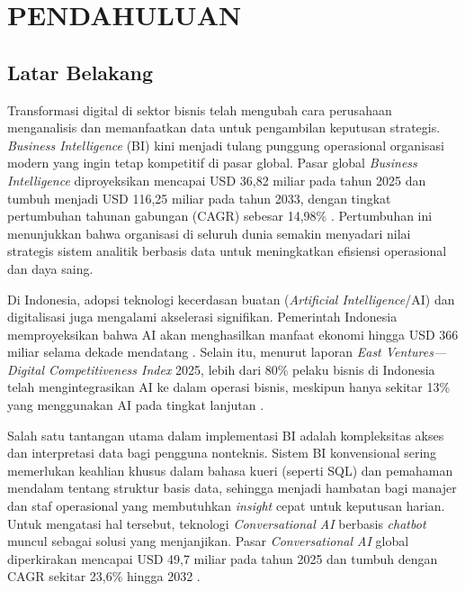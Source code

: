 \chapter{PENDAHULUAN}
\label{chap:pendahuluan}
\section{Latar Belakang}

Transformasi digital di sektor bisnis telah mengubah cara perusahaan menganalisis dan memanfaatkan data untuk pengambilan keputusan strategis. \textit{Business Intelligence} (BI) kini menjadi tulang punggung operasional organisasi modern yang ingin tetap kompetitif di pasar global. Pasar global \textit{Business Intelligence} diproyeksikan mencapai USD 36{,}82 miliar pada tahun 2025 dan tumbuh menjadi USD 116{,}25 miliar pada tahun 2033, dengan tingkat pertumbuhan tahunan gabungan (CAGR) sebesar 14{,}98\% \parencite{Straits2024}. Pertumbuhan ini menunjukkan bahwa organisasi di seluruh dunia semakin menyadari nilai strategis sistem analitik berbasis data untuk meningkatkan efisiensi operasional dan daya saing.

Di Indonesia, adopsi teknologi kecerdasan buatan (\textit{Artificial Intelligence}/AI) dan digitalisasi juga mengalami akselerasi signifikan. Pemerintah Indonesia memproyeksikan bahwa AI akan menghasilkan manfaat ekonomi hingga USD 366 miliar selama dekade mendatang \parencite{Intimedia2024}. Selain itu, menurut laporan \textit{East Ventures—Digital Competitiveness Index} 2025, lebih dari 80\% pelaku bisnis di Indonesia telah mengintegrasikan AI ke dalam operasi bisnis, meskipun hanya sekitar 13\% yang menggunakan AI pada tingkat lanjutan \parencite{EastVC2025}.

Salah satu tantangan utama dalam implementasi BI adalah kompleksitas akses dan interpretasi data bagi pengguna nonteknis. Sistem BI konvensional sering memerlukan keahlian khusus dalam bahasa kueri (seperti SQL) dan pemahaman mendalam tentang struktur basis data, sehingga menjadi hambatan bagi manajer dan staf operasional yang membutuhkan \textit{insight} cepat untuk keputusan harian. Untuk mengatasi hal tersebut, teknologi \textit{Conversational AI} berbasis \textit{chatbot} muncul sebagai solusi yang menjanjikan. Pasar \textit{Conversational AI} global diperkirakan mencapai USD 49{,}7 miliar pada tahun 2025 dan tumbuh dengan CAGR sekitar 23{,}6\% hingga 2032 \parencite{Qaltivate2025}.

